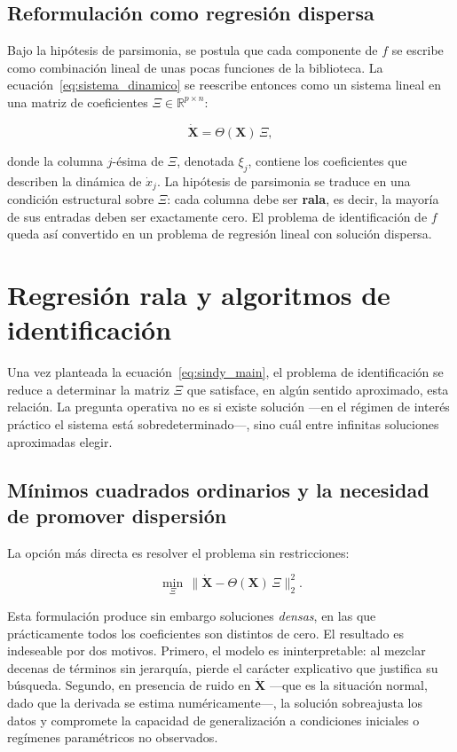 \subsection{Reformulación como regresión dispersa}

Bajo la hipótesis de parsimonia, se postula que cada componente de $f$ se escribe como combinación lineal de unas pocas funciones de la biblioteca. La ecuación~\eqref{eq:sistema_dinamico} se reescribe entonces como un sistema lineal en una matriz de coeficientes $\Xi \in \mathbb{R}^{p \times n}$:

\begin{equation}
\dot{\mathbf{X}} = \Theta(\mathbf{X})\,\Xi,
\tag{2.2}
\label{eq:sindy_main}
\end{equation}

donde la columna $j$-ésima de $\Xi$, denotada $\xi_j$, contiene los coeficientes que describen la dinámica de $\dot{x}_j$. La hipótesis de parsimonia se traduce en una condición estructural sobre $\Xi$: cada columna debe ser \textbf{rala}, es decir, la mayoría de sus entradas deben ser exactamente cero. El problema de identificación de $f$ queda así convertido en un problema de regresión lineal con solución dispersa.

\section{Regresión rala y algoritmos de identificación}
\label{2:sec:regresion_dispersa}

Una vez planteada la ecuación~\eqref{eq:sindy_main}, el problema de identificación se reduce a determinar la matriz $\Xi$ que satisface, en algún sentido aproximado, esta relación. La pregunta operativa no es si existe solución —en el régimen de interés práctico el sistema está sobredeterminado—, sino cuál entre infinitas soluciones aproximadas elegir.

\subsection{Mínimos cuadrados ordinarios y la necesidad de promover dispersión}

La opción más directa es resolver el problema sin restricciones:

\[
\min_{\Xi}\, \|\dot{\mathbf{X}} - \Theta(\mathbf{X})\,\Xi\|_2^2.
\]

Esta formulación produce sin embargo soluciones \textit{densas}, en las que prácticamente todos los coeficientes son distintos de cero. El resultado es indeseable por dos motivos. Primero, el modelo es ininterpretable: al mezclar decenas de términos sin jerarquía, pierde el carácter explicativo que justifica su búsqueda. Segundo, en presencia de ruido en $\dot{\mathbf{X}}$ —que es la situación normal, dado que la derivada se estima numéricamente—, la solución sobreajusta los datos y compromete la capacidad de generalización a condiciones iniciales o regímenes paramétricos no observados.

